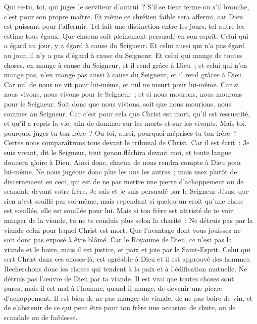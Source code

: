 \begin{multicols}{2}
Qui es-tu, toi, qui juges le serviteur d'autrui~? S'il se tient ferme ou s'il bronche, c'est pour son propre maître. Et même ce chrétien faible sera affermi, car Dieu est puissant pour l'affermir.
Tel fait une distinction entre les jours, tel autre les estime tous égaux. Que chacun soit pleinement persuadé en son esprit.
Celui qui a égard au jour, y a égard à cause du Seigneur. Et celui aussi qui n'a pas égard au jour, il n'y a pas d'égard à cause du Seigneur. Et celui qui mange de toutes choses, en mange à cause du Seigneur, et il rend grâce à Dieu~; et celui qui n'en mange pas, n'en mange pas aussi à cause du Seigneur, et il rend grâces à Dieu.
Car nul de nous ne vit pour lui-même, et nul ne meurt pour lui-même.
Car si nous vivons, nous vivons pour le Seigneur~; et si nous mourons, nous mourons pour le Seigneur. Soit donc que nous vivions, soit que nous mourions, nous sommes au Seigneur.
Car c'est pour cela que Christ est mort, qu'il est ressuscité, et qu'il a repris la vie, afin de dominer sur les morts et sur les vivants.
Mais toi, pourquoi juges-tu ton frère~? Ou toi, aussi, pourquoi méprises-tu ton frère~? Certes nous comparaîtrons tous devant le tribunal de Christ.
Car il est écrit~: Je suis vivant, dit le Seigneur, tout genou fléchira devant moi, et toute langue donnera gloire à Dieu.
 Ainsi donc, chacun de nous rendra compte à Dieu pour lui-même.
Ne nous jugeons donc plus les uns les autres~; mais usez plutôt de discernement en ceci, qui est de ne pas mettre une pierre d'achoppement ou de scandale devant votre frère.
Je sais et je suis persuadé par le Seigneur Jésus, que rien n'est souillé par soi-même, mais cependant si quelqu'un croit qu'une chose est souillée, elle est souillée pour lui.
Mais si ton frère est attristé de te voir manger de la viande, tu ne te conduis plus selon la charité~: Ne détruis pas par la viande celui pour lequel Christ est mort.
Que l'avantage dont vous jouissez ne soit donc pas exposé à être blâmé.
Car le Royaume de Dieu, ce n'est pas la viande et le boire, mais il est justice, et paix et joie par le Saint-Esprit.
Celui qui sert Christ dans ces choses-là, est agréable à Dieu et il est approuvé des hommes.
Recherchons donc les choses qui tendent à la paix et à l'édification mutuelle.
Ne détruis pas l'œuvre de Dieu par ta viande. Il est vrai que toutes choses sont pures, mais il est mal à l'homme, quand il mange, de devenir une pierre d'achoppement.
Il est bien de ne pas manger de viande, de ne pas boire de vin, et de s'abstenir de ce qui peut être pour ton frère une occasion de chute, ou de scandale ou de faiblesse.

\end{multicols}
